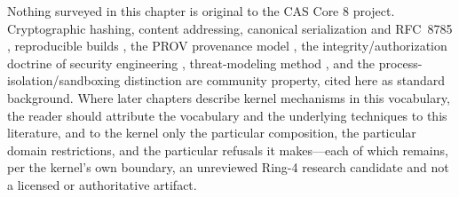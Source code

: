 \begin{boundary}\label{ch02:bd-nonovel}
Nothing surveyed in this chapter is original to the CAS Core 8
project. Cryptographic hashing, content addressing, canonical
serialization and RFC~8785 \cite{jcs}, reproducible builds
\cite{reprobuilds}, the PROV provenance model \cite{prov}, the
integrity/authorization doctrine of security engineering
\cite{anderson}, threat-modeling method \cite{shostack}, and the
process-isolation/sandboxing distinction are community property,
cited here as standard background. Where later chapters describe
kernel mechanisms in this vocabulary, the reader should attribute
the vocabulary and the underlying techniques to this literature,
and to the kernel only the particular composition, the particular
domain restrictions, and the particular refusals it makes---each of
which remains, per the kernel's own boundary, an unreviewed Ring-4
research candidate and not a licensed or authoritative artifact.
\end{boundary}
